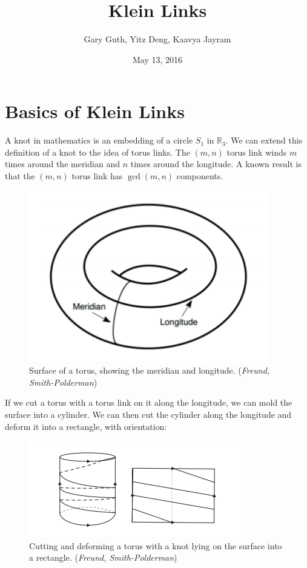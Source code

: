 \documentclass[12pt]{article}
\begin{document}
 
 
\title{Klein Links}
\author{Gary Guth, Yitz Deng, Kaavya Jayram}
\date{May 13, 2016}
\maketitle

\section{Basics of Klein Links}

A knot in mathematics is an embedding of a circle $S_1$ in $\mathbb{R}_3$. We can extend this definition of a knot to the idea of torus links. The $(m, n)$ torus link winds $m$ times around the meridian and $n$ times around the longitude. A known result is that the $(m,n)$ torus link has $\gcd(m,n)$ components.

\begin{figure}[H]
\centering
\includegraphics{meridianlongitude}
\caption{\label{Torus} Surface of a torus, showing the meridian and longitude. (\textit{Freund, Smith-Polderman})}
\end{figure}

If we cut a torus with a torus link on it along the longitude, we can mold the surface into a cylinder. We can then cut the cylinder along the longitude and deform it into a rectangle, with orientation:



\begin{figure}[H]
\centering
\includegraphics{deformtorusknot}
\caption{\label{Klein knot formation p1} Cutting and deforming a torus with a knot lying on the surface into a rectangle. (\textit{Freund, Smith-Polderman})}
\end{figure}
\end{document}
